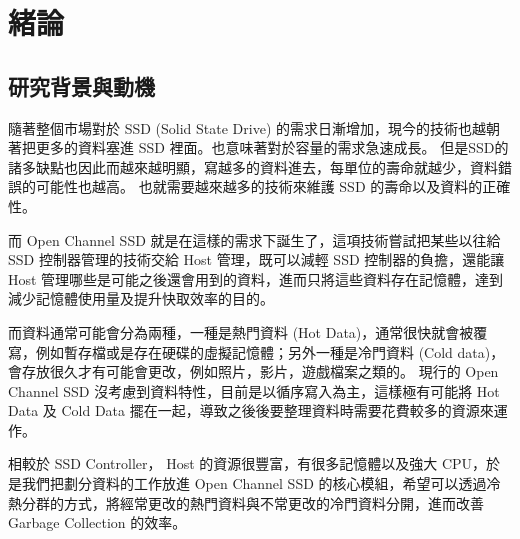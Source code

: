 \chapter{緒論}
\section{研究背景與動機}
\indent
隨著整個市場對於 SSD (Solid State Drive) 的需求日漸增加，現今的技術也越朝著把更多的資料塞進 SSD 裡面。也意味著對於容量的需求急速成長。
但是SSD的諸多缺點也因此而越來越明顯，寫越多的資料進去，每單位的壽命就越少，資料錯誤的可能性也越高。
也就需要越來越多的技術來維護 SSD 的壽命以及資料的正確性。

而 Open Channel SSD 就是在這樣的需求下誕生了，這項技術嘗試把某些以往給 SSD 控制器管理的技術交給 Host 管理，既可以減輕 SSD 控制器的負擔，還能讓 Host 管理哪些是可能之後還會用到的資料，進而只將這些資料存在記憶體，達到減少記憶體使用量及提升快取效率的目的。

而資料通常可能會分為兩種，一種是熱門資料 (Hot Data)，通常很快就會被覆寫，例如暫存檔或是存在硬碟的虛擬記憶體；另外一種是冷門資料 (Cold data)，會存放很久才有可能會更改，例如照片，影片，遊戲檔案之類的。
現行的 Open Channel SSD 沒考慮到資料特性，目前是以循序寫入為主，這樣極有可能將 Hot Data 及 Cold Data 擺在一起，導致之後後要整理資料時需要花費較多的資源來運作。

相較於 SSD Controller， Host 的資源很豐富，有很多記憶體以及強大 CPU，於是我們把劃分資料的工作放進 Open Channel SSD 的核心模組，希望可以透過冷熱分群的方式，將經常更改的熱門資料與不常更改的冷門資料分開，進而改善 Garbage Collection 的效率。



